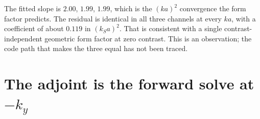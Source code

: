 \documentclass[11pt,a4paper]{article}
\begin{document}
\noindent The fitted slope is $2.00$, $1.99$, $1.99$, which is the $(ka)^2$ convergence the form
factor predicts. The residual is identical in all three channels at every $ka$, with a coefficient
of about $0.119$ in $(k_S a)^2$. That is consistent with a single contrast-independent geometric
form factor at zero contrast. This is an observation; the code path that makes the three equal has
not been traced.

\section{The adjoint is the forward solve at \texorpdfstring{$-k_y$}{-ky}}\label{sec:selfadj}
\end{document}
